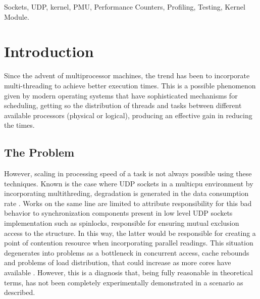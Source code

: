 \documentclass[journal]{IEEEtran}
\begin{document}
\begin{IEEEkeywords}
Sockets, UDP, kernel, PMU, Performance Counters, Profiling, Testing, Kernel Module.
\end{IEEEkeywords}






%
\IEEEpeerreviewmaketitle



\section{Introduction}
Since the advent of multiprocessor machines, the trend has been to incorporate multi-threading to achieve better execution times. This is a possible phenomenon given by modern operating systems that have sophisticated mechanisms for scheduling, getting so the distribution of threads and tasks between different available processors (physical or logical), producing an effective gain in reducing the times.
\subsection*{The Problem}
However, scaling in processing speed of a task is not always possible using these techniques. Known is the case where UDP sockets in a multicpu environment by incorporating multithreding, degradation is generated in the data consumption rate \cite{bib:diegoRivera, bib:hp}. Works on the same line are limited to attribute responsibility for this bad behavior to synchronization components present in low level UDP sockets implementation such as spinlocks, responsible for ensuring mutual exclusion access to the structure. In this way, the latter would be responsible for creating a point of contention resource when incorporating parallel readings. This situation degenerates into problems as a bottleneck in concurrent access, cache rebounds and problems of load distribution, that could increase as more cores have available \cite{bib:google}. However, this is a diagnosis that, being fully reasonable in theoretical terms, has not been completely experimentally demonstrated in a scenario as described.
\end{document}
